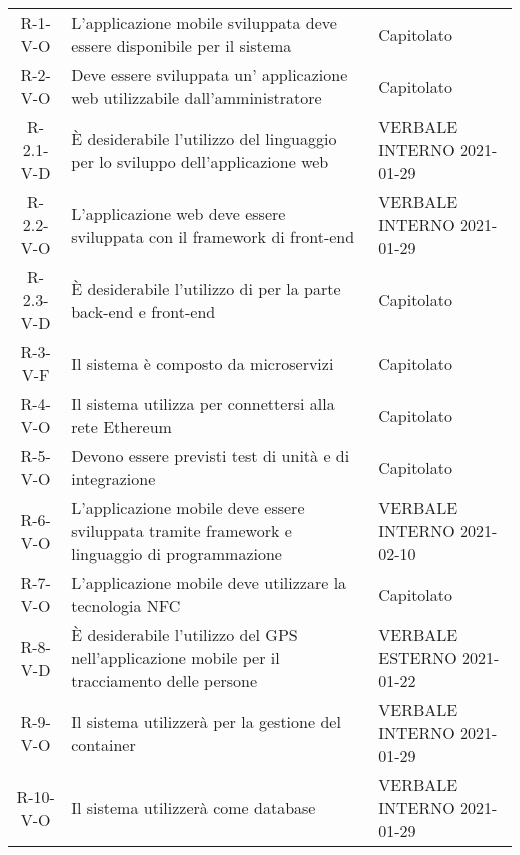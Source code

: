 \begin{longtable}{ c C{7.5cm} C{3cm} }
    R-1-V-O     & L'applicazione mobile sviluppata deve essere disponibile per il sistema  & Capitolato\\
    R-2-V-O     & Deve essere sviluppata un' applicazione web utilizzabile dall'amministratore & Capitolato\\
    R-2.1-V-D   & \`{E} desiderabile l'utilizzo del linguaggio  per lo sviluppo dell'applicazione web & VERBALE INTERNO 2021-01-29 \\
    R-2.2-V-O   & L'applicazione web deve essere sviluppata con il framework di front-end  & VERBALE INTERNO 2021-01-29 \\
    R-2.3-V-D   & \`{E} desiderabile l'utilizzo di  per la parte back-end e front-end &  Capitolato \\
    R-3-V-F     & Il sistema è composto da microservizi & Capitolato\\
    R-4-V-O     & Il sistema utilizza  per connettersi alla rete Ethereum & Capitolato\\
    R-5-V-O     & Devono essere previsti test di unità e di integrazione & Capitolato\\
    R-6-V-O     & L'applicazione mobile deve essere sviluppata tramite framework  e linguaggio di programmazione  & VERBALE INTERNO 2021-02-10 \\
    R-7-V-O     & L'applicazione mobile deve utilizzare la tecnologia NFC & Capitolato \\
    R-8-V-D     & \`{E} desiderabile l'utilizzo del GPS nell'applicazione mobile per il tracciamento delle persone & VERBALE ESTERNO 2021-01-22 \\
    R-9-V-O     & Il sistema utilizzerà  per la gestione del container & VERBALE INTERNO 2021-01-29 \\
    R-10-V-O    & Il sistema utilizzerà  come database & VERBALE INTERNO 2021-01-29 \\



\end{longtable}